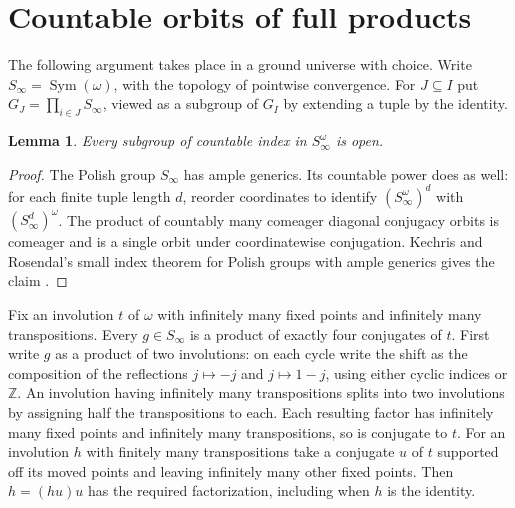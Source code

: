 \documentclass[11pt]{article}
\newtheorem{lemma}[theorem]{Lemma}
\newcommand{\Sinf}{S_\infty}
\begin{document}
\section{Countable orbits of full products}
The following argument takes place in a ground universe with choice. Write $\Sinf=\operatorname{Sym}(\omega)$, with the topology of pointwise convergence. For $J\subseteq I$ put $G_J=\prod_{i\in J}\Sinf$, viewed as a subgroup of $G_I$ by extending a tuple by the identity.
\begin{lemma}\label{countable}
Every subgroup of countable index in $\Sinf^\omega$ is open.
\end{lemma}
\begin{proof}
The Polish group $\Sinf$ has ample generics. Its countable power does as well: for each finite tuple length $d$, reorder coordinates to identify $(\Sinf^\omega)^d$ with $(\Sinf^d)^\omega$. The product of countably many comeager diagonal conjugacy orbits is comeager and is a single orbit under coordinatewise conjugation. Kechris and Rosendal's small index theorem for Polish groups with ample generics gives the claim \cite{kr}.
\end{proof}

Fix an involution $t$ of $\omega$ with infinitely many fixed points and infinitely many transpositions. Every $g\in\Sinf$ is a product of exactly four conjugates of $t$. First write $g$ as a product of two involutions: on each cycle write the shift as the composition of the reflections $j\mapsto -j$ and $j\mapsto 1-j$, using either cyclic indices or $\mathbb Z$. An involution having infinitely many transpositions splits into two involutions by assigning half the transpositions to each. Each resulting factor has infinitely many fixed points and infinitely many transpositions, so is conjugate to $t$. For an involution $h$ with finitely many transpositions take a conjugate $u$ of $t$ supported off its moved points and leaving infinitely many other fixed points. Then $h=(hu)u$ has the required factorization, including when $h$ is the identity.
\end{document}
